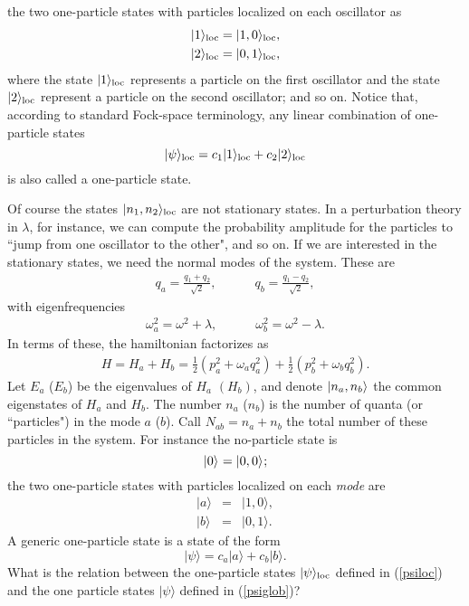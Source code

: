 \documentclass[10pt, nofootinbib]{revtex4}
\newcommand{\bea}{\begin{eqnarray}}
\newcommand{\eea}{\end{eqnarray}}
\begin{document}
the two one-particle states with particles localized on each 
oscillator as
\begin{eqnarray} 
|1\rangle_{\rm loc}= |1,0\rangle_{\rm loc}, 
\label{1loc}\\
|2\rangle_{\rm loc}= |0,1\rangle_{\rm loc}, 
\end{eqnarray}
where the state $|1\rangle_{\rm loc}$ represents a particle on the
first oscillator and the state $|2\rangle_{\rm loc}$ represent a
particle on the second oscillator; and so on.  Notice that, according
to standard Fock-space terminology, any linear combination of
one-particle states
\begin{equation} 
|\psi\rangle_{\rm loc}= c_{1}|1\rangle_{\rm loc}+c_{2}|2\rangle_{\rm loc} 
\label{psiloc}
\end{equation}
is also called a one-particle state. 

Of course the states $|n_{1},n_{2}\rangle_{\rm loc}$ are not
stationary states.  In a perturbation theory in $\lambda$, for
instance, we can compute the probability amplitude for the
particles to ``jump from one oscillator to the other", and so on.  If
we are interested in the stationary states, we need the normal modes of
the system.  These are
%
\bea 
q_a =\frac{q_{1}+q_{2}}{\sqrt{2}}, \hspace{3em}
q_b = \frac{q_{1}-q_{2} }{ \sqrt{2}}, 
\label{modes}
\eea
%
with eigenfrequencies
%
\bea
\omega_{{a}}^2 = \omega^2 + \lambda, \hspace{3em} \omega_{{b}}^2 = 
\omega^2 - \lambda.  
\eea
%
In terms of these, the hamiltonian factorizes as
%
\bea
H = H_{a} + H_{b} =
\frac{1}{2}\left(p_a^2 +\omega_{a}q_a^2\right)  +
\frac{1}{2}\left(p_b^2 +\omega_{b}q_b^2\right)  .
\eea
%
Let $E_{a}$ ($E_{b}$) be the eigenvalues of $H_{a}$ $(H_{b})$, and
denote $|n_{a},n_{b}\rangle_{\rm }$ the common eigenstates of
$H_{a}$ and $H_{b}$.  The number $n_{a}$ ($n_{b}$) is the number of
quanta (or ``particles") in the mode $a$ ($b$).  Call
$N_{ab}=n_{a}+n_{b}$ the total number of these particles in the
system.  For instance the no-particle state is
%
\begin{equation} 
|0\rangle_{\rm }=  |0,0\rangle_{\rm };
\label{ab0}
\end{equation}
%
the two one-particle states with particles localized on each
\emph{mode} are
\begin{eqnarray} 
| a\rangle &=& |1,0\rangle, 
\label{a}\\
| b\rangle &=& |0,1\rangle. 
\end{eqnarray}
A generic one-particle state is a state of the form
%
\begin{equation} 
|\psi\rangle = c_{a} |a\rangle + c_{b} |b\rangle.
\label{psiglob}
\end{equation}
%
What is the relation between the one-particle states
$|\psi\rangle_{\rm loc}$ defined in (\ref{psiloc}) and the one particle
states $|\psi\rangle$ defined in (\ref{psiglob})?
\end{document}
